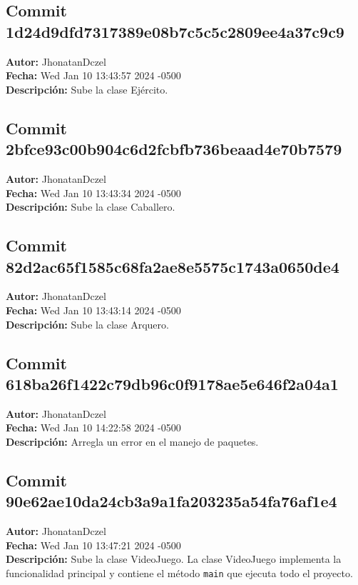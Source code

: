 \subsection*{Commit 1d24d9dfd7317389e08b7c5c5c2809ee4a37c9c9}
\textbf{Autor:} JhonatanDczel \\
\textbf{Fecha:} Wed Jan 10 13:43:57 2024 -0500 \\
\textbf{Descripción:} Sube la clase Ejército.

\subsection*{Commit 2bfce93c00b904c6d2fcbfb736beaad4e70b7579}
\textbf{Autor:} JhonatanDczel \\
\textbf{Fecha:} Wed Jan 10 13:43:34 2024 -0500 \\
\textbf{Descripción:} Sube la clase Caballero.

\subsection*{Commit 82d2ac65f1585c68fa2ae8e5575c1743a0650de4}
\textbf{Autor:} JhonatanDczel \\
\textbf{Fecha:} Wed Jan 10 13:43:14 2024 -0500 \\
\textbf{Descripción:} Sube la clase Arquero.

\subsection*{Commit 618ba26f1422c79db96c0f9178ae5e646f2a04a1}
\textbf{Autor:} JhonatanDczel \\
\textbf{Fecha:} Wed Jan 10 14:22:58 2024 -0500 \\
\textbf{Descripción:} Arregla un error en el manejo de paquetes.

\subsection*{Commit 90e62ae10da24cb3a9a1fa203235a54fa76af1e4}
\textbf{Autor:} JhonatanDczel \\
\textbf{Fecha:} Wed Jan 10 13:47:21 2024 -0500 \\
\textbf{Descripción:} Sube la clase VideoJuego. La clase VideoJuego implementa la funcionalidad principal y contiene el método \texttt{main} que ejecuta todo el proyecto.

